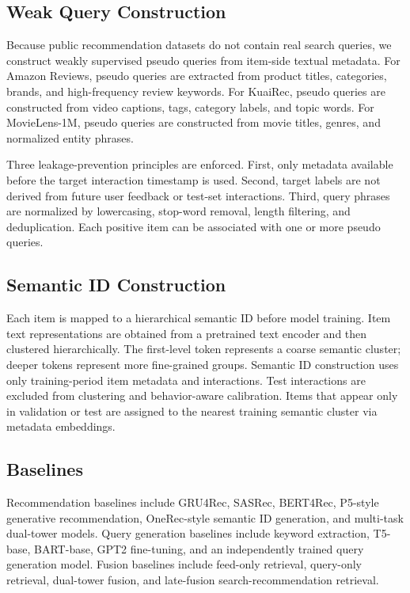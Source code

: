\documentclass[11pt]{article}
\begin{document}
\subsection{Weak Query Construction}

Because public recommendation datasets do not contain real search queries, we construct weakly supervised pseudo queries from item-side textual metadata. For Amazon Reviews, pseudo queries are extracted from product titles, categories, brands, and high-frequency review keywords. For KuaiRec, pseudo queries are constructed from video captions, tags, category labels, and topic words. For MovieLens-1M, pseudo queries are constructed from movie titles, genres, and normalized entity phrases.

Three leakage-prevention principles are enforced. First, only metadata available before the target interaction timestamp is used. Second, target labels are not derived from future user feedback or test-set interactions. Third, query phrases are normalized by lowercasing, stop-word removal, length filtering, and deduplication. Each positive item can be associated with one or more pseudo queries.

\subsection{Semantic ID Construction}

Each item is mapped to a hierarchical semantic ID before model training. Item text representations are obtained from a pretrained text encoder and then clustered hierarchically. The first-level token represents a coarse semantic cluster; deeper tokens represent more fine-grained groups. Semantic ID construction uses only training-period item metadata and interactions. Test interactions are excluded from clustering and behavior-aware calibration. Items that appear only in validation or test are assigned to the nearest training semantic cluster via metadata embeddings.

\subsection{Baselines}

Recommendation baselines include GRU4Rec, SASRec, BERT4Rec, P5-style generative recommendation, OneRec-style semantic ID generation, and multi-task dual-tower models. Query generation baselines include keyword extraction, T5-base, BART-base, GPT2 fine-tuning, and an independently trained query generation model. Fusion baselines include feed-only retrieval, query-only retrieval, dual-tower fusion, and late-fusion search-recommendation retrieval.
\end{document}
